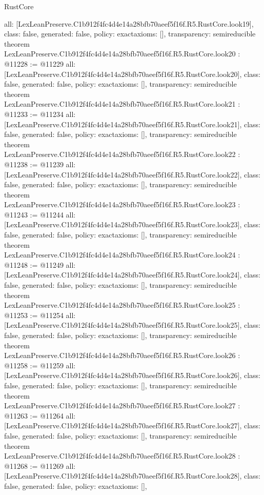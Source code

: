 \begin{lexlean}{RustCore}
\begin{coremodule}
{  all: [LexLeanPreserve.C1b912f4fc4d4e14a28bfb70aeef5f16f.R5.RustCore.look19],
  class: false,
  generated: false,
  policy: exact{axioms: []},
  transparency: semireducible
}
theorem LexLeanPreserve.C1b912f4fc4d4e14a28bfb70aeef5f16f.R5.RustCore.look20 : @11228 := @11229 {
  all: [LexLeanPreserve.C1b912f4fc4d4e14a28bfb70aeef5f16f.R5.RustCore.look20],
  class: false,
  generated: false,
  policy: exact{axioms: []},
  transparency: semireducible
}
theorem LexLeanPreserve.C1b912f4fc4d4e14a28bfb70aeef5f16f.R5.RustCore.look21 : @11233 := @11234 {
  all: [LexLeanPreserve.C1b912f4fc4d4e14a28bfb70aeef5f16f.R5.RustCore.look21],
  class: false,
  generated: false,
  policy: exact{axioms: []},
  transparency: semireducible
}
theorem LexLeanPreserve.C1b912f4fc4d4e14a28bfb70aeef5f16f.R5.RustCore.look22 : @11238 := @11239 {
  all: [LexLeanPreserve.C1b912f4fc4d4e14a28bfb70aeef5f16f.R5.RustCore.look22],
  class: false,
  generated: false,
  policy: exact{axioms: []},
  transparency: semireducible
}
theorem LexLeanPreserve.C1b912f4fc4d4e14a28bfb70aeef5f16f.R5.RustCore.look23 : @11243 := @11244 {
  all: [LexLeanPreserve.C1b912f4fc4d4e14a28bfb70aeef5f16f.R5.RustCore.look23],
  class: false,
  generated: false,
  policy: exact{axioms: []},
  transparency: semireducible
}
theorem LexLeanPreserve.C1b912f4fc4d4e14a28bfb70aeef5f16f.R5.RustCore.look24 : @11248 := @11249 {
  all: [LexLeanPreserve.C1b912f4fc4d4e14a28bfb70aeef5f16f.R5.RustCore.look24],
  class: false,
  generated: false,
  policy: exact{axioms: []},
  transparency: semireducible
}
theorem LexLeanPreserve.C1b912f4fc4d4e14a28bfb70aeef5f16f.R5.RustCore.look25 : @11253 := @11254 {
  all: [LexLeanPreserve.C1b912f4fc4d4e14a28bfb70aeef5f16f.R5.RustCore.look25],
  class: false,
  generated: false,
  policy: exact{axioms: []},
  transparency: semireducible
}
theorem LexLeanPreserve.C1b912f4fc4d4e14a28bfb70aeef5f16f.R5.RustCore.look26 : @11258 := @11259 {
  all: [LexLeanPreserve.C1b912f4fc4d4e14a28bfb70aeef5f16f.R5.RustCore.look26],
  class: false,
  generated: false,
  policy: exact{axioms: []},
  transparency: semireducible
}
theorem LexLeanPreserve.C1b912f4fc4d4e14a28bfb70aeef5f16f.R5.RustCore.look27 : @11263 := @11264 {
  all: [LexLeanPreserve.C1b912f4fc4d4e14a28bfb70aeef5f16f.R5.RustCore.look27],
  class: false,
  generated: false,
  policy: exact{axioms: []},
  transparency: semireducible
}
theorem LexLeanPreserve.C1b912f4fc4d4e14a28bfb70aeef5f16f.R5.RustCore.look28 : @11268 := @11269 {
  all: [LexLeanPreserve.C1b912f4fc4d4e14a28bfb70aeef5f16f.R5.RustCore.look28],
  class: false,
  generated: false,
  policy: exact{axioms: []},
}
\end{coremodule}
\end{lexlean}
